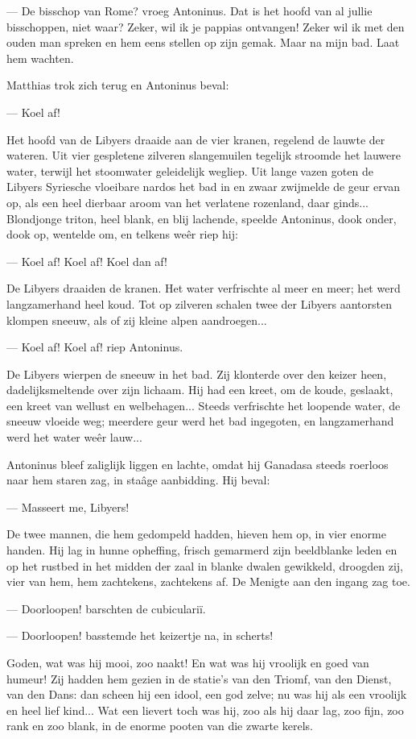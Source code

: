 \documentclass[a4paper, 12pt, oneside, dutch]{article}
\begin{document}
--- De bisschop van Rome? vroeg Antoninus. Dat is het hoofd van al jullie bisschoppen, niet waar? Zeker, wil ik je pappias ontvangen! Zeker wil ik met den ouden man spreken en hem eens stellen op zijn gemak. Maar na mijn bad. Laat hem wachten.

Matthias trok zich terug en Antoninus beval:

--- Koel af!

Het hoofd van de Libyers draaide aan de vier kranen, regelend de lauwte der wateren. Uit vier gespletene zilveren slangemuilen tegelijk stroomde het lauwere water, terwijl het stoomwater geleidelijk wegliep. Uit lange vazen goten de Libyers Syriesche vloeibare nardos het bad in en zwaar zwijmelde de geur ervan op, als een heel dierbaar aroom van het verlatene rozenland, daar ginds... Blondjonge triton, heel blank, en blij lachende, speelde Antoninus, dook onder, dook op, wentelde om, en telkens weêr riep hij:

--- Koel af! Koel af! Koel dan af!

De Libyers draaiden de kranen. Het water verfrischte al meer en meer; het werd langzamerhand heel koud. Tot op zilveren schalen twee der Libyers aantorsten klompen sneeuw, als of zij kleine alpen aandroegen...

--- Koel af! Koel af! riep Antoninus.

De Libyers wierpen de sneeuw in het bad. Zij klonterde over den keizer heen, dadelijksmeltende over zijn lichaam. Hij had een kreet, om de koude, geslaakt, een kreet van wellust en welbehagen... Steeds verfrischte het loopende water, de sneeuw vloeide weg; meerdere geur werd het bad ingegoten, en langzamerhand werd het water weêr lauw...

Antoninus bleef zaliglijk liggen en lachte, omdat hij Ganadasa steeds roerloos naar hem staren zag, in staâge aanbidding. Hij beval:

--- Masseert me, Libyers!

De twee mannen, die hem gedompeld hadden, hieven hem op, in vier enorme handen. Hij lag in hunne opheffing, frisch gemarmerd zijn beeldblanke leden en op het rustbed in het midden der zaal in blanke dwalen gewikkeld, droogden zij, vier van hem, hem zachtekens, zachtekens af. De Menigte aan den ingang zag toe.

--- Doorloopen! barschten de cubiculariï.

--- Doorloopen! basstemde het keizertje na, in scherts!

Goden, wat was hij mooi, zoo naakt! En wat was hij vroolijk en goed van humeur! Zij hadden hem gezien in de statie's van den Triomf, van den Dienst, van den Dans: dan scheen hij een idool, een god zelve; nu was hij als een vroolijk en heel lief kind... Wat een lievert toch was hij, zoo als hij daar lag, zoo fijn, zoo rank en zoo blank, in de enorme pooten van die zwarte kerels.
\end{document}
